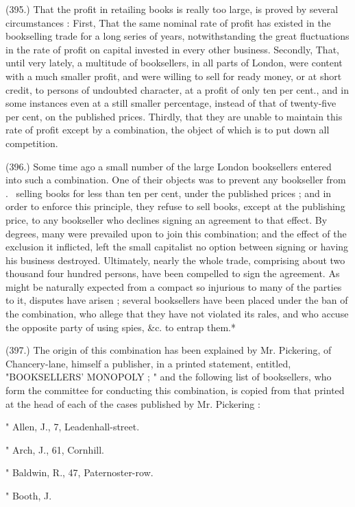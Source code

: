 \documentclass{article}
\begin{document}
(395.) That the profit in retailing books is really too large, is proved by several circumstances : First, That the same nominal rate of profit has existed in the bookselling trade for a long series of years, notwithstanding the great fluctuations in the rate of profit on capital invested in every other business. Secondly, That, until very lately, a multitude of booksellers, in all parts of London, were content with a much smaller profit, and were willing to sell for ready money, or at short credit, to persons of undoubted character, at a profit of only ten per cent., and in some instances even at a still smaller percentage, instead of that of twenty-five per cent, on the published prices. Thirdly, that they are unable to maintain this rate of profit except by a combination, the object of which is to put down all competition.


(396.) Some time ago a small number of the large London booksellers entered into such a combination. One of their objects was to prevent any bookseller from . \ selling books for less than ten per cent, under the published prices ; and in order to enforce this principle, they refuse to sell books, except at the publishing price, to any bookseller who declines signing an agreement to that effect. By degrees, many were prevailed upon to join this combination; and the effect of the exclusion it inflicted, left the small capitalist no option between signing or having his business destroyed. Ultimately, nearly the whole trade, comprising about two thousand four hundred persons, have been compelled to sign the agreement. As might be naturally expected from a compact so injurious to many of the parties to it, disputes have arisen ; several booksellers have been placed under the ban of the combination, who allege that they have not violated its rales, and who accuse the opposite party of using spies, \&c. to entrap them.*


(397.) The origin of this combination has been explained by Mr. Pickering, of Chancery-lane, himself a publisher, in a printed statement, entitled, "BOOKSELLERS' MONOPOLY ; " and the following list of booksellers, who form the committee for conducting this combination, is copied from that printed at the head of each of the cases published by Mr. Pickering :


" Allen, J., 7, Leadenhall-street.


" Arch, J., 61, Cornhill.


" Baldwin, R., 47, Paternoster-row.


" Booth, J.
\end{document}
